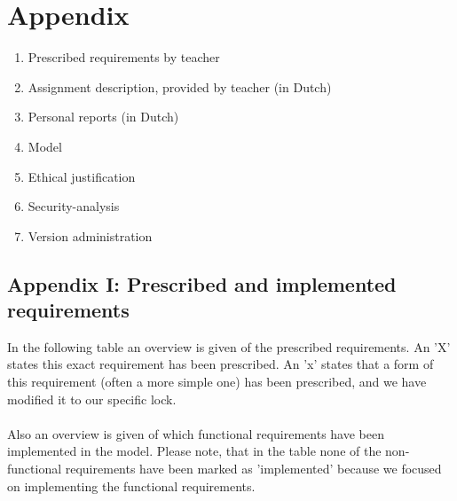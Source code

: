 \documentclass{article}
\begin{document}
\newpage

\newpage



\newpage

\section{Appendix}
\begin{enumerate}[label=\Roman*.]
    \item Prescribed requirements by teacher
    \item Assignment description, provided by teacher (in Dutch)
    \item Personal reports (in Dutch)
    \item Model
    \item Ethical justification
    \item Security-analysis
    \item Version administration 
\end{enumerate}

\newpage
\subsection*{Appendix I: Prescribed and implemented requirements} 

    In the following table an overview is given of the prescribed requirements. An 'X' states this exact requirement has been prescribed. An 'x' states that a form of this requirement (often a more simple one) has been prescribed, and we have modified it to our specific lock. \\\\
    Also an overview is given of which functional requirements have been implemented in the model. Please note, that in the table none of the non-functional requirements have been marked as 'implemented' because we focused on implementing the functional requirements.  
\end{document}
